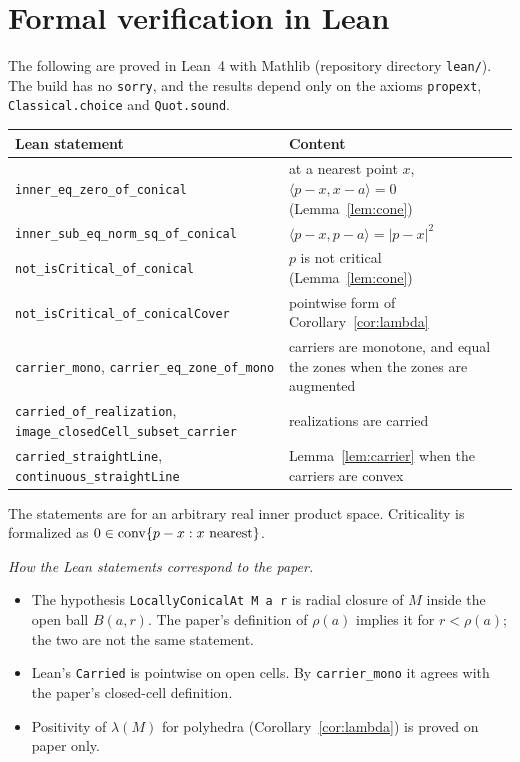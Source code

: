 \section{Formal verification in Lean}\label{sec:lean}

The following are proved in Lean~4 with Mathlib (repository directory \texttt{lean/}). The build has no
\texttt{sorry}, and the results depend only on the axioms \texttt{propext}, \texttt{Classical.choice} and
\texttt{Quot.sound}.

\begin{center}\small
\begin{tabular}{p{6.6cm}p{6.4cm}}
\toprule
Lean statement & Content \\
\midrule
\texttt{inner\_eq\_zero\_of\_conical} & at a nearest point $x$, $\langle p-x,x-a\rangle=0$ (Lemma~\ref{lem:cone}) \\
\texttt{inner\_sub\_eq\_norm\_sq\_of\_conical} & $\langle p-x,p-a\rangle=|p-x|^2$ \\
\texttt{not\_isCritical\_of\_conical} & $p$ is not critical (Lemma~\ref{lem:cone}) \\
\texttt{not\_isCritical\_of\_conicalCover} & pointwise form of Corollary~\ref{cor:lambda} \\
\texttt{carrier\_mono}, \texttt{carrier\_eq\_zone\_of\_mono} & carriers are monotone, and equal the zones when the
zones are augmented \\
\texttt{carried\_of\_realization}, \texttt{image\_closedCell\_subset\_carrier} & realizations are carried \\
\texttt{carried\_straightLine}, \texttt{continuous\_straightLine} & Lemma~\ref{lem:carrier} when the carriers
are convex \\
\bottomrule
\end{tabular}
\end{center}

The statements are for an arbitrary real inner product space. Criticality is formalized as
$0\in\operatorname{conv}\{p-x:x\text{ nearest}\}$.

\emph{How the Lean statements correspond to the paper.}
\begin{itemize}
\item The hypothesis \texttt{LocallyConicalAt M a r} is radial closure of $M$ inside the open ball $B(a,r)$. The
paper's definition of $\rho(a)$ implies it for $r<\rho(a)$; the two are not the same statement.
\item Lean's \texttt{Carried} is pointwise on open cells. By \texttt{carrier\_mono} it agrees with the paper's
closed-cell definition.
\item Positivity of $\lambda(M)$ for polyhedra (Corollary~\ref{cor:lambda}) is proved on paper only.
\end{itemize}
